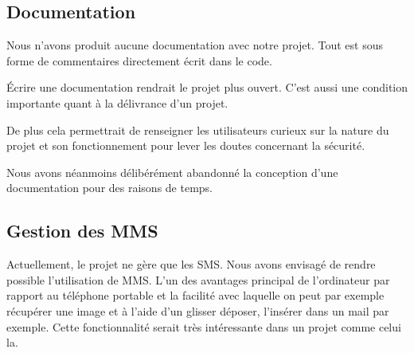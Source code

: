 
\subsection{Documentation}

Nous n'avons produit aucune documentation avec notre projet.
Tout est sous forme de commentaires directement écrit dans le code.

Écrire une documentation rendrait le projet plus ouvert.
C'est aussi une condition importante quant à la délivrance d'un projet.

De plus cela permettrait de renseigner les utilisateurs curieux sur la nature du projet et son fonctionnement pour lever les doutes concernant la sécurité.

Nous avons néanmoins délibérément abandonné la conception d'une documentation pour des raisons de temps.




\subsection{Gestion des MMS}

Actuellement, le projet ne gère que les SMS. Nous avons envisagé de rendre possible l'utilisation de MMS. L'un des avantages principal
de l'ordinateur par rapport au téléphone portable et la facilité avec laquelle on peut par exemple récupérer une image et à l'aide d'un
glisser déposer, l'insérer dans un mail par exemple. Cette fonctionnalité serait très intéressante dans un projet comme celui la. 